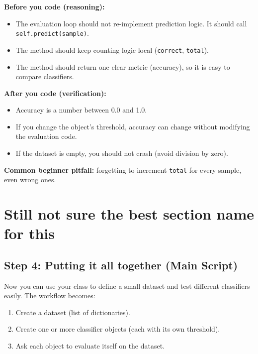 \noindent
\textbf{Before you code (reasoning):}
\begin{itemize}\setlength{\itemsep}{2pt}
    \item The evaluation loop should not re-implement prediction logic. It should call \texttt{self.predict(sample)}.
    \item The method should keep counting logic local (\texttt{correct}, \texttt{total}).
    \item The method should return one clear metric (accuracy), so it is easy to compare classifiers.
\end{itemize}

\noindent
\textbf{After you code (verification):}
\begin{itemize}\setlength{\itemsep}{2pt}
    \item Accuracy is a number between 0.0 and 1.0.
    \item If you change the object's threshold, accuracy can change without modifying the evaluation code.
    \item If the dataset is empty, you should not crash (avoid division by zero).
\end{itemize}

\noindent
\textbf{Common beginner pitfall:} forgetting to increment \texttt{total} for every sample, even wrong ones.


\section{Still not sure the best section name for this}


\subsection{Step 4: Putting it all together (Main Script)}
Now you can use your class to define a small dataset and test different classifiers easily.
The workflow becomes:
\begin{enumerate}
    \item Create a dataset (list of dictionaries).
    \item Create one or more classifier objects (each with its own threshold).
    \item Ask each object to evaluate itself on the dataset.
\end{enumerate}

